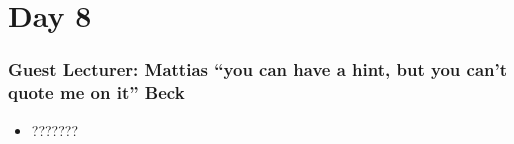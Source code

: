 \documentclass[../notes.tex]{subfiles}
\begin{document}
\section{Day 8}
    \subsubsection{Guest Lecturer: Mattias ``you can have a hint, but you can't quote me on it'' Beck}
    \begin{itemize}
        \item ???????
    \end{itemize}
\end{document}
